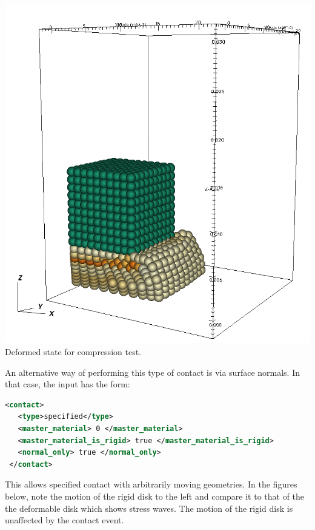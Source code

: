 \begin{minipage}[t]{0.25\textwidth}
  \centering
  \includegraphics[width=0.9\columnwidth]{FIGS/contact/rigid_compression_end.png}
  {Deformed state for compression test.}
\end{minipage}

An alternative way of performing this type of contact is via surface normals.
In that case, the input has the form:
\begin{lstlisting}[language=XML]
 <contact>
   <type>specified</type>
   <master_material> 0 </master_material>
   <master_material_is_rigid> true </master_material_is_rigid>
   <normal_only> true </normal_only>
 </contact>
\end{lstlisting}
This allows specified contact with arbitrarily moving geometries. In the
figures below, note the motion of the rigid disk to the left and compare it 
to that of the the deformable disk which shows stress waves.  The
motion of the rigid disk is unaffected by the contact event.

